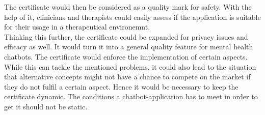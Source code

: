 \documentclass[sigconf, nonacm]{acmart}
\begin{document}
The certificate would then be considered as a quality mark for safety.
With the help of it, clinicians and therapists could easily assess if the application is suitable for their usage in a therapeutical environemnt.\\
Thinking this further, the certificate could be expanded for privacy issues and efficacy as well. It would turn it into a general quality feature for mental health chatbots. The certificate would enforce the implementation of certain aspects. While this can tackle the mentioned problems, it could also lead to the situation
that alternative concepts might not have a chance to compete on the market if they do not fulfil a certain aspect. Hence it would be necessary to keep the certificate dynamic. The conditions a chatbot-application has to meet in order to get it should not be static.
\end{document}
